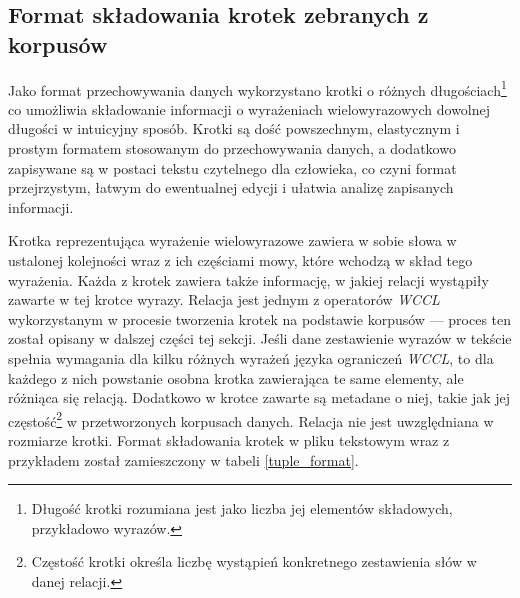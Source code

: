 \subsection{Format składowania krotek zebranych z korpusów}
Jako format przechowywania danych wykorzystano krotki o różnych długościach\footnote{Długość krotki rozumiana jest jako liczba jej elementów składowych, przykładowo wyrazów.} co umożliwia składowanie informacji o wyrażeniach wielowyrazowych dowolnej długości w intuicyjny sposób.
Krotki są dość powszechnym, elastycznym i prostym formatem stosowanym do przechowywania danych, a dodatkowo zapisywane są w postaci tekstu czytelnego dla człowieka, co czyni format przejrzystym, łatwym do ewentualnej edycji i ułatwia analizę zapisanych informacji.

\par
Krotka reprezentująca wyrażenie wielowyrazowe zawiera w sobie słowa w ustalonej kolejności wraz z ich częściami mowy, które wchodzą w skład tego wyrażenia.
Każda z krotek zawiera także informację, w jakiej relacji wystąpiły zawarte w tej krotce wyrazy.
Relacja jest jednym z operatorów \emph{WCCL} wykorzystanym w procesie tworzenia krotek na podstawie korpusów --- proces ten został opisany w dalszej części tej sekcji.
Jeśli dane zestawienie wyrazów w tekście spełnia wymagania dla kilku różnych wyrażeń języka ograniczeń \emph{WCCL}, to dla każdego z nich powstanie osobna krotka zawierająca te same elementy, ale różniąca się relacją.
Dodatkowo w krotce zawarte są metadane o niej, takie jak jej częstość\footnote{Częstość krotki określa liczbę wystąpień konkretnego zestawienia słów w danej relacji.} w przetworzonych korpusach danych.
Relacja nie jest uwzględniana w rozmiarze krotki.
Format składowania krotek w pliku tekstowym wraz z przykładem został zamieszczony w tabeli \ref{tuple_format}.

